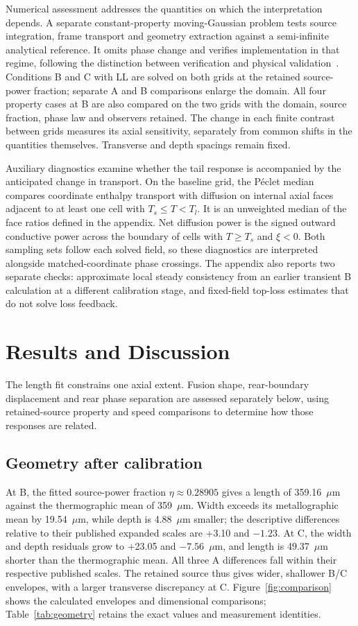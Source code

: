 \documentclass[preprint,12pt]{elsarticle}
\newcommand{\um}{\ensuremath{\mu\mathrm{m}}}
\begin{document}
Numerical assessment addresses the quantities on which the interpretation depends. A separate constant-property moving-Gaussian problem tests source integration, frame transport and geometry extraction against a semi-infinite analytical reference. It omits phase change and verifies implementation in that regime, following the distinction between verification and physical validation~\cite{oberkampf2002}. Conditions B and C with LL are solved on both grids at the retained source-power fraction; separate A and B comparisons enlarge the domain. All four property cases at B are also compared on the two grids with the domain, source fraction, phase law and observers retained. The change in each finite contrast between grids measures its axial sensitivity, separately from common shifts in the quantities themselves. Transverse and depth spacings remain fixed.

Auxiliary diagnostics examine whether the tail response is accompanied by the anticipated change in transport. On the baseline grid, the P\'eclet median compares coordinate enthalpy transport with diffusion on internal axial faces adjacent to at least one cell with $T_s\leq T<T_l$. It is an unweighted median of the face ratios defined in the appendix. Net diffusion power is the signed outward conductive power across the boundary of cells with $T\geq T_s$ and $\xi<0$. Both sampling sets follow each solved field, so these diagnostics are interpreted alongside matched-coordinate phase crossings. The appendix also reports two separate checks: approximate local steady consistency from an earlier transient B calculation at a different calibration stage, and fixed-field top-loss estimates that do not solve loss feedback.

\section{Results and Discussion}
\label{sec:discussion}
The length fit constrains one axial extent. Fusion shape, rear-boundary displacement and rear phase separation are assessed separately below, using retained-source property and speed comparisons to determine how those responses are related.

\subsection{Geometry after calibration}

At B, the fitted source-power fraction $\eta\approx0.28905$ gives a length of 359.16~\um{} against the thermographic mean of 359~\um. Width exceeds its metallographic mean by 19.54~\um{}, while depth is 4.88~\um{} smaller; the descriptive differences relative to their published expanded scales are +3.10 and $-1.23$. At C, the width and depth residuals grow to +23.05 and $-7.56$~\um{}, and length is 49.37~\um{} shorter than the thermographic mean. All three A differences fall within their respective published scales. The retained source thus gives wider, shallower B/C envelopes, with a larger transverse discrepancy at C. Figure~\ref{fig:comparison} shows the calculated envelopes and dimensional comparisons; Table~\ref{tab:geometry} retains the exact values and measurement identities.
\end{document}

